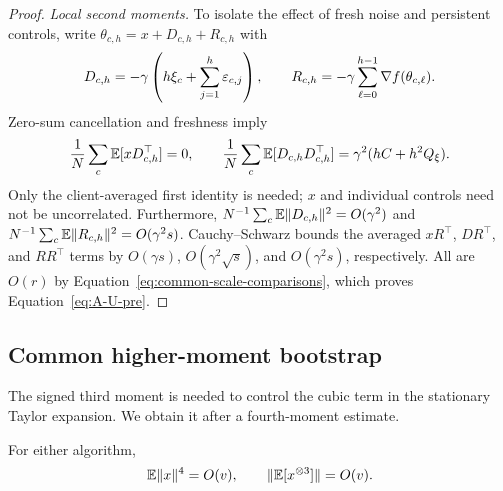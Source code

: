 \begin{proof}
\emph{Local second moments.}
To isolate the effect of fresh noise and persistent controls, write
$\theta_{c,h}=x+D_{c,h}+R_{c,h}$ with
\begin{equation}
\label{eq:A-DR}
 D_{c,h}=-\gamma\left(h\xi_c+\sum_{j=1}^h\varepsilon_{c,j}\right),\qquad
 R_{c,h}=-\gamma\sum_{\ell=0}^{h-1}\nabla f(\theta_{c,\ell}).
\end{equation}
Zero-sum cancellation and freshness imply
\begin{equation}
\label{eq:A-DD}
 \frac1N\sum_c\mathbb{E}[xD_{c,h}^\top]=0,\qquad
 \frac1N\sum_c\mathbb{E}[D_{c,h}D_{c,h}^\top]=\gamma^2(hC+h^2Q_\xi).
\end{equation}
Only the client-averaged first identity is needed; $x$ and individual controls
need not be uncorrelated. Furthermore,
$N^{-1}\sum_c\mathbb{E}\|D_{c,h}\|^2=O(\gamma^2)$ and
$N^{-1}\sum_c\mathbb{E}\|R_{c,h}\|^2=O(\gamma^2s)$.
Cauchy--Schwarz bounds the averaged $xR^\top$, $DR^\top$, and $RR^\top$
terms by $O(\gamma s)$, $O(\gamma^2\sqrt{s})$, and $O(\gamma^2s)$,
respectively. All are $O(r)$ by Equation~\eqref{eq:common-scale-comparisons},
which proves Equation~\eqref{eq:A-U-pre}.
\end{proof}

\subsection{Common higher-moment bootstrap}
\label{app:common-higher}

The signed third moment is needed to control the cubic term in the
stationary Taylor expansion. We obtain it after a fourth-moment estimate.

\begin{lemma}
\label{lem:common-higher}
For either algorithm,
\begin{equation}
\label{eq:A-higher-moments}
 \mathbb{E}\|x\|^4=O(v),\qquad \|\mathbb{E}[x^{\otimes3}]\|=O(v).
\end{equation}
\end{lemma}

